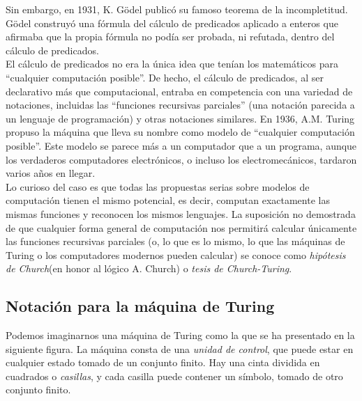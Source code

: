Sin embargo, en 1931, K. Gödel publicó su famoso teorema de la incompletitud. Gödel construyó una fórmula del cálculo de predicados aplicado a enteros que afirmaba que la propia fórmula no podía ser probada, ni refutada, dentro del cálculo de predicados. \\

El cálculo de predicados no era la única idea que tenían los matemáticos para ``cualquier computación posible''. De hecho, el cálculo de predicados, al ser declarativo más que computacional, entraba en competencia con una variedad de notaciones, incluidas las ``funciones recursivas parciales'' (una notación parecida a un lenguaje de programación) y otras notaciones similares. En 1936, A.M. Turing propuso la máquina que lleva su nombre como modelo de ``cualquier computación posible''. Este modelo se parece más a un computador que a un programa, aunque los verdaderos computadores electrónicos, o incluso los electromecánicos, tardaron varios años en llegar. \\

Lo curioso del caso es que todas las propuestas serias sobre modelos de computación tienen el mismo potencial, es decir, computan exactamente las mismas funciones y reconocen los mismos lenguajes. La suposición no demostrada de que cualquier forma general de computación nos permitirá calcular únicamente las funciones recursivas parciales (o, lo que es lo mismo, lo que las máquinas de Turing o los computadores modernos pueden calcular) se conoce como \emph{hipótesis de Church}(en honor al lógico A. Church) o \emph{tesis de Church-Turing}.\\

\subsection{Notación para la máquina de Turing}

Podemos imaginarnos una máquina de Turing como la que se ha presentado en la siguiente figura. La máquina consta de una \emph{unidad de control}, que puede estar en cualquier estado tomado de un conjunto finito. Hay una cinta dividida en cuadrados o \emph{casillas}, y cada casilla puede contener un símbolo, tomado de otro conjunto finito.\\

